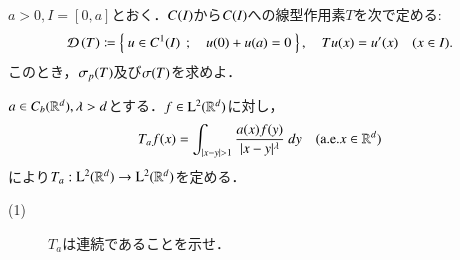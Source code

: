 	
	\begin{screen}
		[4]$a > 0,I = [0,a]$とおく．$C(I)$から$C(I)$への線型作用素$T$を次で定める:
			\begin{align}
				\Dom{T} \coloneqq \Set{u \in \cn{I}{1}}{u(0) + u(a) = 0},
				\quad Tu(x) = u'(x) \quad (x \in I).
			\end{align}
			このとき，$\mathfrak{\sigma}_p (T) $及び$\mathfrak{\sigma} (T) $を求めよ．
	\end{screen}
	
	
	
	\begin{screen}
		[6] $a \in C_b (\mathbb{R}^d), \lambda > d$とする．$f \in \mathrm{L}^2(\mathbb{R}^d)$に対し，
		\begin{align}
			T_a f(x) = \int_{|x - y| > 1} \frac{a(x)f(y)}{|x-y|^\lambda}\ dy
			\quad (\mbox{a.e.}x \in \mathbb{R}^d)
		\end{align}
		により$T_a:\mathrm{L}^2(\mathbb{R}^d) \rightarrow \mathrm{L}^2(\mathbb{R}^d)$を定める．
		\begin{description}
			\item[(1)] $T_a$は連続であることを示せ．
		\end{description}
	\end{screen}
	
